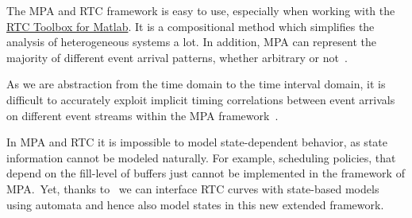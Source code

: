 The MPA and RTC framework is easy to use, especially when working with the \href{https://www.mpa.ethz.ch/}{RTC Toolbox for Matlab}.
It is a compositional method which simplifies the analysis of heterogeneous systems a lot.
In addition, MPA can represent the majority of different event arrival patterns, whether arbitrary or not~\cite{cho:08}.


As we are abstraction from the time domain to the time interval domain, it is
difficult to accurately exploit implicit timing correlations between event arrivals on different event streams within the MPA framework~\cite{wan:06}.

In MPA and RTC it is impossible to model state-dependent behavior, as state information cannot be modeled naturally. 
For example, scheduling policies, that depend on the fill-level of buffers just cannot be implemented in the framework of MPA.\
Yet, thanks to~\cite{pha} we can interface RTC curves with state-based models using automata and hence also model states in this new extended framework.